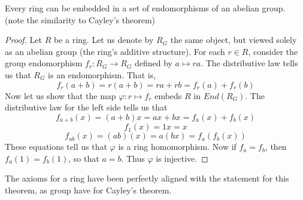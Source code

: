 \begin{lemma}
    Every ring can be embedded in a set of endomorphisms of an abelian group. (note the similarity to Cayley's theorem)
\end{lemma}
\begin{proof}
    Let $R$ be a ring. Let us denote by $R_G$ the same object, but viewed solely as an abelian group (the ring's additive structure). For each $r \in R$, consider the group endomorphism $f_r:R_G \to R_G$ defined by $a \mapsto ra$. The distributive law tells us that $R_G$ is an endomorphism. That is,
    \[ f_r(a + b) = r(a + b) = ra + rb = f_r(a) + f_r(b) \]
    Now let us show that the map $\varphi: r \mapsto f_r$ embeds $R$ in $End(R_G)$. The distributive law for the left side tells us that
    \[  f_{a + b}(x) = (a + b)x = ax + bx = f_a(x) + f_b(x) \]
    \[ f_{1}(x) = 1x = x \]
    \[ f_{ab}(x) = (ab)(x) = a(bx) = f_a(f_b(x)) \]
    These equations tell us that $\varphi$ is a ring homomorphism. Now if $f_a = f_b$, then $f_a(1) = f_b(1)$, so that $a = b$. Thus $\varphi$ is injective.
\end{proof}

The axioms for a ring have been perfectly aligned with the statement for this theorem, as group have for Cayley's theorem.

